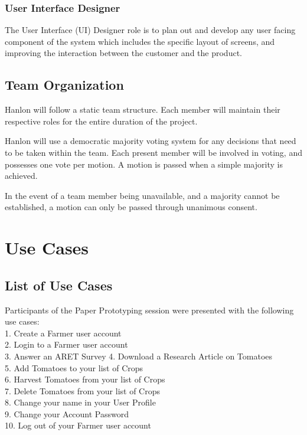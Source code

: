 \documentclass[12pt,letterpaper]{article}
\begin{document}
\subsubsection*{User Interface Designer}
The User Interface (UI) Designer role is to plan out and develop any user facing component of the system which includes the specific layout of screens, and improving the interaction between the customer and the product.

\subsection{Team Organization}
Hanlon will follow a static team structure. Each member will maintain their respective roles for the entire duration of the project. \par

Hanlon will use a democratic majority voting system for any decisions that need to be taken within the team. Each present member will be involved in voting, and possesses one vote per motion. A motion is passed when a simple majority is achieved. \par

In the event of a team member being unavailable, and a majority cannot be established, a motion can only be passed through unanimous consent.

\clearpage
\section{Use Cases}
\subsection{List of Use Cases}
Participants of the Paper Prototyping session were presented with the following use cases:\\
1.\hspace*{8pt} Create a Farmer user account\\
2.\hspace*{8pt} Login to a Farmer user account\\
3.\hspace*{8pt} Answer an ARET Survey
4.\hspace*{8pt} Download a Research Article on Tomatoes\\
5.\hspace*{8pt} Add Tomatoes to your list of Crops\\
6.\hspace*{8pt} Harvest Tomatoes from your list of Crops\\
7.\hspace*{8pt} Delete Tomatoes from your list of Crops\\
8.\hspace*{8pt} Change your name in your User Profile\\
9.\hspace*{8pt} Change your Account Password\\
10.\hspace*{3pt} Log out of your Farmer user account
\end{document}
